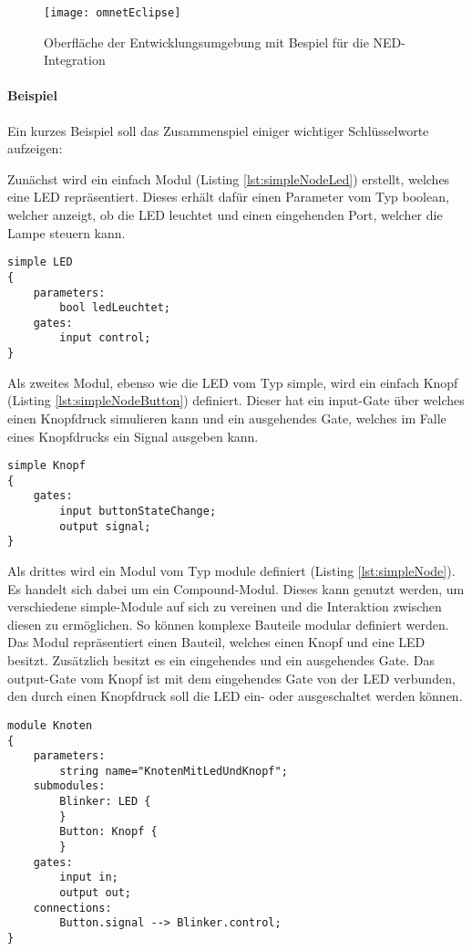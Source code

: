 \begin{figure}[htbp]
\centering
\caption{Oberfläche der Entwicklungsumgebung mit Bespiel für die NED-Integration}
\label{fig:messageEvent}
\texttt{[image: omnetEclipse]}
\end{figure}

\paragraph{Beispiel} Ein kurzes Beispiel soll das Zusammenspiel einiger wichtiger Schlüsselworte aufzeigen:

\label{StartNedExample}

Zunächst wird ein einfach Modul (Listing \ref{lst:simpleNodeLed}) erstellt, welches eine LED repräsentiert. Dieses erhält dafür einen Parameter vom Typ boolean, welcher anzeigt, ob die LED leuchtet und einen eingehenden Port, welcher die Lampe steuern kann. 
\begin{lstlisting}[language=ned,caption={einfaches Modul: LED},label=lst:simpleNodeLed]
simple LED
{
	parameters:
		bool ledLeuchtet;
	gates:
		input control;
}
\end{lstlisting}

Als zweites Modul, ebenso wie die LED vom Typ simple, wird ein einfach Knopf (Listing \ref{lst:simpleNodeButton}) definiert. Dieser hat ein input-Gate über welches einen Knopfdruck simulieren kann und ein ausgehendes Gate, welches im Falle eines Knopfdrucks ein Signal ausgeben kann.
\begin{lstlisting}[language=ned,caption={einfaches Modul: Knopf},label=lst:simpleNodeButton]
simple Knopf
{
	gates:
		input buttonStateChange;
		output signal;
}
\end{lstlisting}

Als drittes wird ein Modul vom Typ module definiert (Listing \ref{lst:simpleNode}). Es handelt sich dabei um ein Compound-Modul. Dieses kann genutzt werden, um verschiedene simple-Module auf sich zu vereinen und die Interaktion zwischen diesen zu ermöglichen. So können komplexe Bauteile modular definiert werden.\\
Das Modul repräsentiert einen Bauteil, welches einen Knopf und eine LED besitzt. Zusätzlich besitzt es ein eingehendes und ein ausgehendes Gate. Das output-Gate vom Knopf ist mit dem eingehendes Gate von der LED verbunden, den durch einen Knopfdruck soll die LED ein- oder ausgeschaltet werden können.
\begin{lstlisting}[language=ned,caption={Compound Modul},label=lst:simpleNode]
module Knoten
{
	parameters:
		string name="KnotenMitLedUndKnopf";
	submodules:
		Blinker: LED {
		}
		Button: Knopf {
		}
	gates:
		input in;
		output out;
	connections:
		Button.signal --> Blinker.control;
}
\end{lstlisting}

